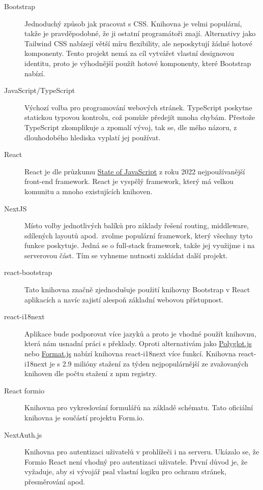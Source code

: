 \begin{description}
    \item[Bootstrap]
    Jednoduchý způsob jak pracovat s CSS\@.
    Knihovna je velmi populární, takže je pravděpodobné, že ji ostatní programátoři znají.
    Alternativy jako Tailwind CSS nabízejí větší míru flexibility, ale neposkytují žádné hotové komponenty.
    Tento projekt nemá za cíl vytvářet vlastní designovou identitu, proto je výhodnější použít hotové komponenty, které Bootstrap nabízí.
    \item[JavaScript/TypeScript]
    Výchozí volba pro programování webových stránek.
    TypeScript poskytne statickou typovou kontrolu, což pomůže předejít mnoha chybám.
    Přestože TypeScript zkomplikuje a zpomalí vývoj, tak se, dle mého názoru, z dlouhodobého hlediska vyplatí jej používat.
    \item[React]
    React je dle průzkumu \href{https://2022.stateofjs.com/en-US/libraries/front-end-frameworks/}{State of JavaScript} z roku 2022 nejpoužívanější front-end framework.
    React je vyspělý framework, který má velkou komunitu a mnoho existujících knihoven.
    \item[NextJS]
    Místo volby jednotlivých balíků pro základy řešení routing, middleware, sdílených layoutů apod.\ zvolme populární framework, který všechny tyto funkce poskytuje.
    Jedná se o full-stack framework, takže jej využijme i na serverovou část.
    Tím se vyhneme nutnosti zakládat další projekt.
    \item[react-bootstrap]
    Tato knihovna značně zjednodušuje použití knihovny Bootstrap v React aplikacích a navíc zajistí alespoň základní webovou přístupnost.
    \item[react-i18next]
    Aplikace bude podporovat více jazyků a proto je vhodné použít knihovnu, která nám usnadní práci s překlady.
    Oproti alternativám jako \href{https://github.com/airbnb/polyglot.js}{Polyglot.js} nebo \href{https://github.com/formatjs/formatjs}{Format.js} nabízí knihovna react-i18next více funkcí.
    Knihovna react-i18next je s 2.9 milióny stažení za týden nejpopulárnější ze zvažovaných knihoven dle počtu stažení z npm registry.
    \item[React formio]
    Knihovna pro vykreslování formulářů na základě schématu.
    Tato oficiální knihovna je součástí projektu Form.io.
    \item[NextAuth.js]
    Knihovna pro autentizaci uživatelů v prohlížeči i na serveru.
    Ukázalo se, že Formio React není vhodný pro autentizaci uživatele.
    První důvod je, že vyžaduje, aby si vývojář psal vlastní logiku pro ochranu stránek, přesměrování apod.

\end{description}
